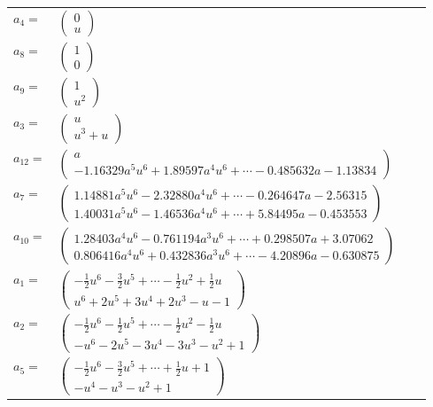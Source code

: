 \documentclass[1p]{elsarticle_modified}
\theoremstyle{definition}
\begin{document}
\begin{tabular}{m{7pt} m{180pt} m{7pt} m{180pt} }
\flushright $a_{4}=$&$\begin{pmatrix}0\\u\end{pmatrix}$ \\
\flushright $a_{8}=$&$\begin{pmatrix}1\\0\end{pmatrix}$ \\
\flushright $a_{9}=$&$\begin{pmatrix}1\\u^2\end{pmatrix}$ \\
\flushright $a_{3}=$&$\begin{pmatrix}u\\u^3+u\end{pmatrix}$ \\
\flushright $a_{12}=$&$\begin{pmatrix}a\\-1.16329 a^{5} u^{6}+1.89597 a^{4} u^{6}+\cdots-0.485632 a-1.13834\end{pmatrix}$ \\
\flushright $a_{7}=$&$\begin{pmatrix}1.14881 a^{5} u^{6}-2.32880 a^{4} u^{6}+\cdots-0.264647 a-2.56315\\1.40031 a^{5} u^{6}-1.46536 a^{4} u^{6}+\cdots+5.84495 a-0.453553\end{pmatrix}$ \\
\flushright $a_{10}=$&$\begin{pmatrix}1.28403 a^{4} u^{6}-0.761194 a^{3} u^{6}+\cdots+0.298507 a+3.07062\\0.806416 a^{4} u^{6}+0.432836 a^{3} u^{6}+\cdots-4.20896 a-0.630875\end{pmatrix}$ \\
\flushright $a_{1}=$&$\begin{pmatrix}-\frac{1}{2} u^6-\frac{3}{2} u^5+\cdots-\frac{1}{2} u^2+\frac{1}{2} u\\u^6+2 u^5+3 u^4+2 u^3- u-1\end{pmatrix}$ \\
\flushright $a_{2}=$&$\begin{pmatrix}-\frac{1}{2} u^6-\frac{1}{2} u^5+\cdots-\frac{1}{2} u^2-\frac{1}{2} u\\- u^6-2 u^5-3 u^4-3 u^3- u^2+1\end{pmatrix}$ \\
\flushright $a_{5}=$&$\begin{pmatrix}-\frac{1}{2} u^6-\frac{3}{2} u^5+\cdots+\frac{1}{2} u+1\\- u^4- u^3- u^2+1\end{pmatrix}$ \\

\end{tabular}
\end{document}

